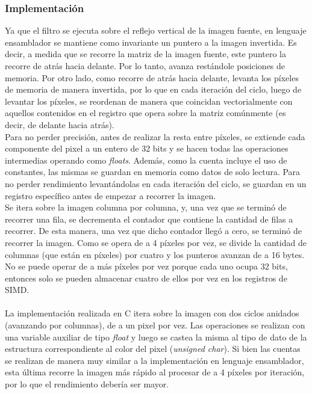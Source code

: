 \documentclass[a4paper]{article}
\begin{document}
\subsubsection{Implementación}
Ya que el filtro se ejecuta sobre el reflejo vertical de la imagen fuente, en lenguaje ensamblador se mantiene como invariante un puntero a la imagen invertida. Es decir, a medida que se recorre la matriz de la imagen fuente, este puntero la recorre de atrás hacia delante. Por lo tanto, avanza restándole posiciones de memoria. Por otro lado, como recorre de atrás hacia delante, levanta los píxeles de memoria de manera invertida, por lo que en cada iteración del ciclo, luego de levantar los píxeles, se reordenan de manera que coincidan vectorialmente con aquellos contenidos en el registro que opera sobre la matriz comúnmente (es decir, de delante hacia atrás).
\\Para no perder precisión, antes de realizar la resta entre píxeles, se extiende cada componente del pixel a un entero de 32 bits y se hacen todas las operaciones intermedias operando como \textit{floats}. Además, como la cuenta incluye el uso de constantes, las mismas se guardan en memoria como datos de solo lectura. Para no perder rendimiento levantándolas en cada iteración del ciclo, se guardan en un registro específico antes de empezar a recorrer la imagen.
\\Se itera sobre la imagen columna por columna, y, una vez que se terminó de recorrer una fila, se decrementa el contador que contiene la cantidad de filas a recorrer. De esta manera, una vez que dicho contador llegó a cero, se terminó de recorrer la imagen. Como se opera de a 4 píxeles por vez, se divide la cantidad de columnas (que están en píxeles) por cuatro y los punteros avanzan de a 16 bytes. No se puede operar de a más píxeles por vez porque cada uno ocupa 32 bits, entonces solo se pueden almacenar cuatro de ellos por vez en los registros de SIMD.
\\
\\
La implementación realizada en C itera sobre la imagen con dos ciclos anidados (avanzando por columnas), de a un pixel por vez. Las operaciones se realizan con una variable auxiliar de tipo \textit{float} y luego se castea la misma al tipo de dato de la estructura correspondiente al color del pixel (\textit{unsigned char}). Si bien las cuentas se realizan de manera muy similar a la implementación en lenguaje ensamblador, esta última recorre la imagen más rápido al procesar de a 4 píxeles por iteración, por lo que el rendimiento debería ser mayor. 
\end{document}
